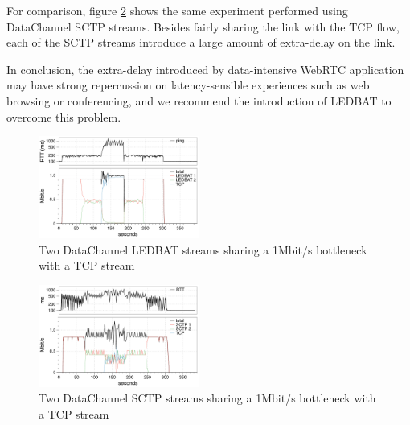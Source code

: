 \documentclass{sig-alternate}
\begin{document}

For comparison, figure \ref{fig:2sctp_tcp} shows the same experiment performed using DataChannel SCTP streams. Besides fairly sharing the link with the TCP flow, each of the SCTP streams introduce a large amount of extra-delay on the link.

In conclusion, the extra-delay introduced by data-intensive WebRTC application may have strong repercussion on latency-sensible experiences such as web browsing or conferencing, and we recommend the introduction of LEDBAT to overcome this problem.

\begin{figure}[t]
  \centering
    \includegraphics[width=0.47\textwidth]{figs/2ledbat_tcp}
\vspace*{-0.38cm}
	\caption{Two DataChannel LEDBAT streams sharing a 1Mbit/s bottleneck with a TCP stream} \label{fig:2ledbat_tcp}
\vspace*{-0.4cm}
\end{figure}

\begin{figure}[t]
  \centering
    \includegraphics[width=0.47\textwidth]{figs/2sctp_tcp}
\vspace*{-0.38cm}
	\caption{Two DataChannel SCTP  streams sharing a 1Mbit/s bottleneck with a TCP stream} \label{fig:2sctp_tcp}
\vspace*{-0.4cm}
\end{figure}



\end{document}
